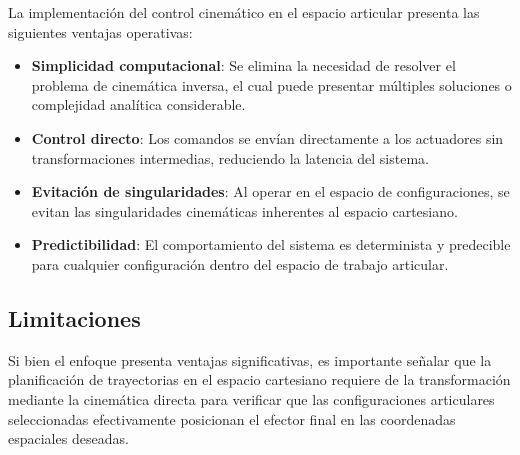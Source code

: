 La implementación del control cinemático en el espacio articular presenta las siguientes ventajas operativas:

\begin{itemize}[label=$\bullet$]
    \item \textbf{Simplicidad computacional}: Se elimina la necesidad de resolver el problema de cinemática inversa, el cual puede presentar múltiples soluciones o complejidad analítica considerable.
    
    \item \textbf{Control directo}: Los comandos se envían directamente a los actuadores sin transformaciones intermedias, reduciendo la latencia del sistema.
    
    \item \textbf{Evitación de singularidades}: Al operar en el espacio de configuraciones, se evitan las singularidades cinemáticas inherentes al espacio cartesiano.
    
    \item \textbf{Predictibilidad}: El comportamiento del sistema es determinista y predecible para cualquier configuración dentro del espacio de trabajo articular.
\end{itemize}

\subsection{Limitaciones}

Si bien el enfoque presenta ventajas significativas, es importante señalar que la planificación de trayectorias en el espacio cartesiano requiere de la transformación mediante la cinemática directa para verificar que las configuraciones articulares seleccionadas efectivamente posicionan el efector final en las coordenadas espaciales deseadas.